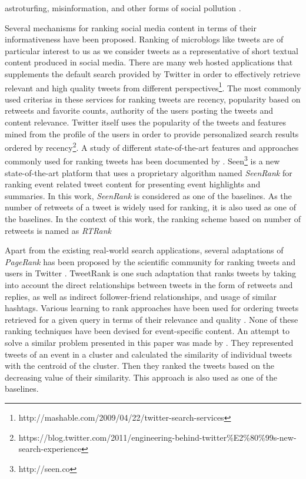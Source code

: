 astroturfing, misinformation, and other forms of social pollution \cite{ratkiewicz2011truthy}.


Several mechanisms for ranking social media content in terms of their informativeness have been proposed. Ranking of microblogs like tweets are of particular interest to us as we consider tweets as a representative of short textual content produced in social media. There are many web hosted applications that supplements the default search provided by Twitter in order to effectively retrieve relevant and high quality tweets from different perspectives\footnote{http://mashable.com/2009/04/22/twitter-search-services}. The most commonly used criterias in these services for ranking tweets are recency, popularity based on retweets and favorite counts, authority of the users posting the tweets and content relevance. Twitter itself uses the popularity of the tweets and features mined from the profile of the users in order to provide personalized search results ordered by recency\footnote{https://blog.twitter.com/2011/engineering-behind-twitter\%E2\%80\%99s-new-search-experience}. A study of different state-of-the-art features and approaches commonly used for ranking tweets has been documented by \cite{Damak2013, nagmoti2010ranking}. Seen\footnote{http://seen.co} is a new state-of-the-art platform that uses a proprietary algorithm named \textit{SeenRank} for ranking event related tweet content for presenting event highlights and summaries. In this work, \textit{SeenRank} is considered as one of the baselines. As the number of retweets of a tweet is widely used for ranking, it is also used as one of the baselines. In the context of this work, the ranking scheme based on number of retweets is named as \textit{RTRank}

Apart from the existing real-world search applications, several adaptations of \textit{PageRank} \cite{page1999pagerank} has been proposed by the scientific community for ranking tweets and users in Twitter \cite{weng2010twitterrank,tunkelang2009twitter, hallberg2012adaptation}. TweetRank \cite{hallberg2012adaptation} is one such adaptation that ranks tweets by taking into account the direct relationships between tweets in the form of retweets and replies, as well as indirect follower-friend relationships, and usage of similar hashtags. Various learning to rank approaches have been used for ordering tweets retrieved for a given query in terms of their relevance and quality \cite{Duan2010,mccreadie2013relevance,vosecky2012searching}. None of these ranking techniques have been devised for event-specific content. An attempt to solve a similar problem presented in this paper was made by \cite{becker2011selecting}. They represented tweets of an event in a cluster and calculated the similarity of individual tweets with the centroid of the cluster. Then they ranked the tweets based on the decreasing value of their similarity. This approach is also used as one of the baselines.

